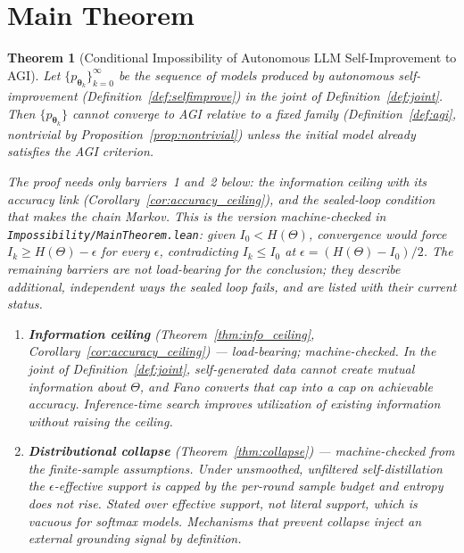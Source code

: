 \documentclass[11pt,a4paper]{article}
\newtheorem{theorem}{Theorem}[section]
\begin{document}
\section{Main Theorem}

\begin{theorem}[Conditional Impossibility of Autonomous LLM Self-Improvement to AGI]
\label{thm:main}
Let $\{p_{\bm{\theta}_k}\}_{k=0}^{\infty}$ be the sequence of models produced by autonomous self-improvement (Definition~\ref{def:selfimprove}) in the joint of Definition~\ref{def:joint}. Then $\{p_{\bm{\theta}_k}\}$ cannot converge to AGI relative to a fixed family (Definition~\ref{def:agi}, nontrivial by Proposition~\ref{prop:nontrivial}) unless the initial model already satisfies the AGI criterion.

The proof needs only barriers~1 and~2 below: the information ceiling with its accuracy link (Corollary~\ref{cor:accuracy_ceiling}), and the sealed-loop condition that makes the chain Markov. This is the version machine-checked in \texttt{Impossibility/MainTheorem.lean}: given $I_0 < H(\Theta)$, convergence would force $I_k \geq H(\Theta) - \epsilon$ for every $\epsilon$, contradicting $I_k \leq I_0$ at $\epsilon = (H(\Theta) - I_0)/2$. The remaining barriers are not load-bearing for the conclusion; they describe additional, independent ways the sealed loop fails, and are listed with their current status.

\begin{enumerate}
    \item \textbf{Information ceiling} (Theorem~\ref{thm:info_ceiling}, Corollary~\ref{cor:accuracy_ceiling}) --- \emph{load-bearing; machine-checked.} In the joint of Definition~\ref{def:joint}, self-generated data cannot create mutual information about $\Theta$, and Fano converts that cap into a cap on achievable accuracy. Inference-time search improves utilization of existing information without raising the ceiling.

    \item \textbf{Distributional collapse} (Theorem~\ref{thm:collapse}) --- \emph{machine-checked from the finite-sample assumptions.} Under unsmoothed, unfiltered self-distillation the $\epsilon$-effective support is capped by the per-round sample budget and entropy does not rise. Stated over effective support, not literal support, which is vacuous for softmax models. Mechanisms that prevent collapse inject an external grounding signal by definition.


\end{enumerate}
\end{theorem}
\end{document}
